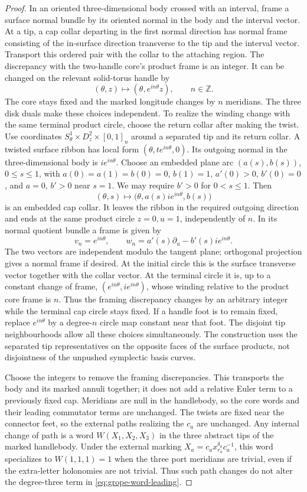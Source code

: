 \begin{proof}
In an oriented three-dimensional body crossed with an interval, frame a
surface normal bundle by its
oriented normal in the body and the interval vector. At a tip, a cap collar
departing in the first normal direction has normal frame consisting of
the in-surface direction transverse to the tip and the interval vector.
Transport this ordered pair with the collar to the attaching region.
The discrepancy with the two-handle core's product frame is an integer.
It can be changed on the relevant solid-torus handle by
\[
 (\theta,z)\longmapsto(\theta,e^{in\theta}z),\qquad n\in\mathbb Z.
\]
The core stays fixed and the marked longitude changes by \(n\) meridians.
The three disk duals make these choices independent. To realize the
winding change with the same terminal product circle, choose the return
collar after making the twist. Use coordinates
\(S^1_\theta\times D^2_z\times[0,1]_u\) around a
separated tip and its return collar.  A twisted surface ribbon has local
form \((\theta,t e^{in\theta},0)\).  Its outgoing normal in the
three-dimensional body is \(i e^{in\theta}\).  Choose an embedded
plane arc \((a(s),b(s))\), \(0\leq s\leq1\), with
\(a(0)=a(1)=b(0)=0\), \(b(1)=1\), \(a'(0)>0\),
\(b'(0)=0\), and \(a=0\), \(b'>0\) near \(s=1\).
We may require \(b'>0\) for \(0<s\leq1\).  Then
\[
 (\theta,s)\longmapsto
       \bigl(\theta,a(s)i e^{in\theta},b(s)\bigr)
\]
is an embedded cap collar.  It leaves the ribbon in the required
outgoing direction and ends at the same product circle \(z=0,u=1\),
independently of \(n\).  In its normal quotient bundle a frame is given by
\[
 v_n=e^{in\theta},\qquad
 w_n=a'(s)\partial_u-b'(s)i e^{in\theta}.
\]
The two vectors are independent modulo the tangent plane; orthogonal
projection gives a normal frame if desired.  At the initial circle this
is the surface transverse vector together with the collar vector.  At
the terminal circle it is, up to a constant change of frame,
\((e^{in\theta},i e^{in\theta})\), whose winding relative to the
product core frame is \(n\).  Thus the framing discrepancy changes by an
arbitrary integer while the terminal cap circle stays fixed.  If a handle
foot is to remain fixed, replace \(e^{in\theta}\) by a degree-\(n\)
circle map constant near that foot.  The disjoint tip neighbourhoods
allow all these choices simultaneously.  The construction uses the
separated tip representatives on the opposite faces of the surface
products, not disjointness of the unpushed symplectic basis curves.

Choose the integers to remove the framing discrepancies. This transports
the body and its marked annuli together; it does not add a relative Euler
term to a previously fixed cap. Meridians are null in the handlebody, so
the core words and their leading commutator terms are unchanged.
The twists are fixed near the connector feet, so the external paths
realizing the \(c_a\) are unchanged.  Any internal change of path is a
word \(W(X_1,X_2,X_3)\) in the three abstract tips of the marked
handlebody.  Under the external marking
\(X_a=c_a x_{r_a}^{\delta_a}c_a^{-1}\), this word specializes to
\(W(1,1,1)=1\) when the three port meridians are trivial, even if the
extra-letter holonomies are not trivial.  Thus such path changes do not
alter the degree-three term in \eqref{eq:grope-word-leading}.


\end{proof}
